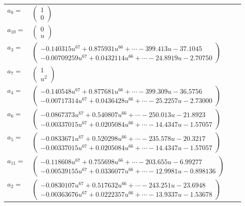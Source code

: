\documentclass[1p]{elsarticle_modified}
\theoremstyle{definition}
\begin{document}
\begin{tabular}{m{7pt} m{180pt} m{7pt} m{180pt} }
\flushright $a_{8}=$&$\begin{pmatrix}1\\0\end{pmatrix}$ \\
\flushright $a_{10}=$&$\begin{pmatrix}0\\u\end{pmatrix}$ \\
\flushright $a_{3}=$&$\begin{pmatrix}-0.140315 u^{67}+0.875931 u^{66}+\cdots-399.413 u-37.1045\\-0.00709259 u^{67}+0.0432114 u^{66}+\cdots-24.8919 u-2.70750\end{pmatrix}$ \\
\flushright $a_{7}=$&$\begin{pmatrix}1\\u^2\end{pmatrix}$ \\
\flushright $a_{4}=$&$\begin{pmatrix}-0.140548 u^{67}+0.877681 u^{66}+\cdots-399.309 u-36.5756\\-0.00717314 u^{67}+0.0436428 u^{66}+\cdots-25.2257 u-2.73000\end{pmatrix}$ \\
\flushright $a_{6}=$&$\begin{pmatrix}-0.0867373 u^{67}+0.540807 u^{66}+\cdots-250.013 u-21.8923\\-0.00337015 u^{67}+0.0205084 u^{66}+\cdots-14.4347 u-1.57057\end{pmatrix}$ \\
\flushright $a_{5}=$&$\begin{pmatrix}-0.0833671 u^{67}+0.520298 u^{66}+\cdots-235.578 u-20.3217\\-0.00337015 u^{67}+0.0205084 u^{66}+\cdots-14.4347 u-1.57057\end{pmatrix}$ \\
\flushright $a_{11}=$&$\begin{pmatrix}-0.118608 u^{67}+0.755698 u^{66}+\cdots-203.655 u-6.99277\\-0.00539155 u^{67}+0.0336077 u^{66}+\cdots-12.9981 u-0.898136\end{pmatrix}$ \\
\flushright $a_{2}=$&$\begin{pmatrix}-0.0830107 u^{67}+0.517632 u^{66}+\cdots-243.251 u-23.6948\\-0.00363676 u^{67}+0.0222357 u^{66}+\cdots-13.9337 u-1.53678\end{pmatrix}$ \\

\end{tabular}
\end{document}
